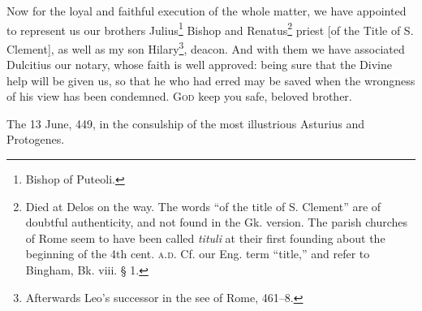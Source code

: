 Now for the loyal and faithful execution of the whole matter, we have appointed to represent us our brothers Julius\footnote{Bishop of Puteoli.} Bishop and Renatus\footnote{Died at Delos on the way. The words “of the title of S. Clement” are of doubtful authenticity, and not found in the Gk. version. The parish churches of Rome seem to have been called \emph{tituli} at their first founding about the beginning of the 4th cent. \textsc{a.d.} Cf. our Eng. term “title,” and refer to Bingham, Bk. viii. § 1.} priest [of the Title of S. Clement], as well as my son Hilary\footnote{Afterwards Leo’s successor in the see of Rome, 461–8.}, deacon. And with them we have associated Dulcitius our notary, whose faith is well approved: being sure that the Divine help will be given us, so that he who had erred may be saved when the wrongness of his view has been condemned. \textsc{God} keep you safe, beloved brother.

The 13 June, 449, in the consulship of the most illustrious Asturius and Protogenes.

